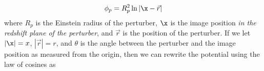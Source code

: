 \begin{equation}
\phi_p = R_p^2 \ln \left| \x - \vec{r} \right| 
\end{equation}
where $R_p$ is the Einstein radius of the perturber, $\x$ is the image position \textit{in the redshift plane of the perturber}, and $\vec{r}$ is the position of the perturber. If we let $|\x| = x$, $|\vec{r}| = r$, and $\theta$ is the angle between the perturber and the image position as measured from the origin, then we can rewrite the potential using the law of cosines as
  
  
  
  